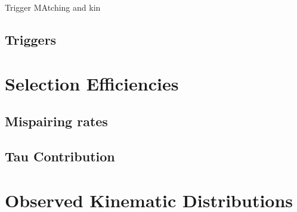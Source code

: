Trigger MAtching and kin
\subsection{Triggers}
\section{Selection Efficiencies}
\subsection{\CZZ}
\subsection{Mispairing rates}
\subsection{Tau Contribution}
\section{Observed Kinematic Distributions}
